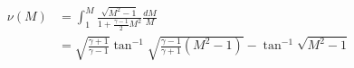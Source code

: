 \documentclass[10pt]{article}
\begin{document}
\begin{align*}\nu \left( M \right)
&=
\int_{1}^{M} \frac{ \sqrt{M^2-1} }{1 + \frac{\gamma-1}{2} M^2 } \frac{dM}{M} \\
&=
\sqrt{ \frac{\gamma+1}{\gamma-1} } \tan^{-1} \sqrt{ \frac{\gamma-1}{\gamma+1} \left( M^2 - 1 \right) } 
-
\tan^{-1} \sqrt{M^2-1}\end{align*}
\end{document}
